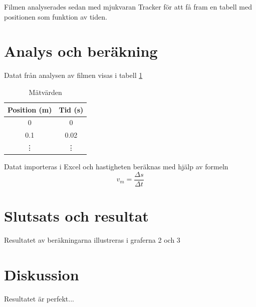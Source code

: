 \documentclass[11p, titlepage, oneside, a4paper]{article}
\begin{document}
        Filmen analyserades sedan med mjukvaran Tracker för att få fram en tabell med positionen som funktion av tiden.
    \newpage
	\section{Analys och beräkning}
        Datat från analysen av filmen visas i tabell \ref{table:result}
    
        
        \begin{table}
            \begin{center}
            \begin{tabular}{ |c|c| } 
                \hline
                Position (m) & Tid (s)  \\ 
                \hline
                0 & 0  \\ 
                0.1 & 0.02 \\
                \vdots & \vdots \\
                \hline
            \end{tabular}
                \caption{Mätvärden}
                \label{table:result}
            \end{center}
        \end{table}            
        

    Datat importeras i Excel och hastigheten beräknas med hjälp av formeln
    \begin{equation}
        v_m = \frac{\Delta s}{\Delta t}
    \end{equation}
    
    \section{Slutsats och resultat} 
        Resultatet av beräkningarna illustreras i graferna 2 och 3
    \section{Diskussion} 
    Resultatet är perfekt...

    
    \printbibliography
\end{document}
